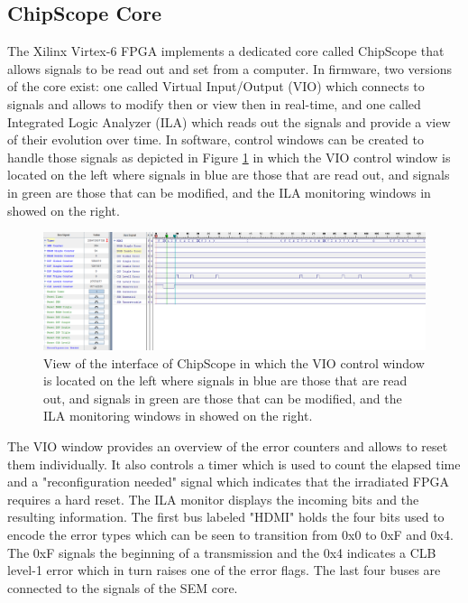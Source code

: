    \subsection{ChipScope Core}

      The Xilinx Virtex-6 FPGA implements a dedicated core called ChipScope that allows signals to be read out and set from a computer. In firmware, two versions of the core exist: one called Virtual Input/Output (VIO) which connects to signals and allows to modify then or view then in real-time, and one called Integrated Logic Analyzer (ILA) which reads out the signals and provide a view of their evolution over time. In software, control windows can be created to handle those signals as depicted in Figure \ref{fig:II-6-cs-clb} in which the VIO control window is located on the left where signals in blue are those that are read out, and signals in green are those that can be modified, and the ILA monitoring windows in showed on the right. \\

      \begin{figure}
        \centering
        \includegraphics[width=\textwidth]{img/II-6-irradiation/cs-clb.png}
        \caption{View of the interface of ChipScope in which the VIO control window is located on the left where signals in blue are those that are read out, and signals in green are those that can be modified, and the ILA monitoring windows in showed on the right.}
        \label{fig:II-6-cs-clb}
      \end{figure}

      The VIO window provides an overview of the error counters and allows to reset them individually. It also controls a timer which is used to count the elapsed time and a "reconfiguration needed" signal which indicates that the irradiated FPGA requires a hard reset. The ILA monitor displays the incoming bits and the resulting information. The first bus labeled "HDMI" holds the four bits used to encode the error types which can be seen to transition from 0x0 to 0xF and 0x4. The 0xF signals the beginning of a transmission and the 0x4 indicates a CLB level-1 error which in turn raises one of the error flags. The last four buses are connected to the signals of the SEM core.

